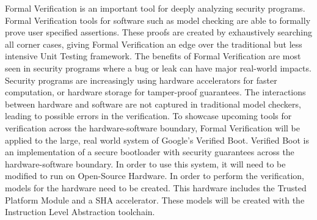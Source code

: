 Formal Verification is an important tool for deeply analyzing security 
programs.
Formal Verification tools for software such as model checking are able to formally prove user specified assertions.
These proofs are created by exhaustively searching all corner cases, giving Formal Verification an edge over the traditional but less intensive Unit Testing framework. 
The benefits of Formal Verification are most seen in security programs where a bug or leak can have major real-world impacts.
Security programs are increasingly using hardware accelerators for faster computation, or hardware storage for tamper-proof guarantees.
The interactions between hardware and software are not captured in traditional model checkers, leading to possible errors in the verification. 
To showcase upcoming tools for verification across the hardware-software boundary, Formal Verification will be applied to the large, real world system of Google's Verified Boot. 
Verified Boot is an implementation of a secure bootloader with security guarantees across the hardware-software boundary. 
In order to use this system, it will need to be modified to run on Open-Source Hardware. 
In order to perform the verification, models for the hardware need to be created.
This hardware includes the Trusted Platform Module and a SHA accelerator.
These models will be created with the Instruction Level Abstraction toolchain. 
